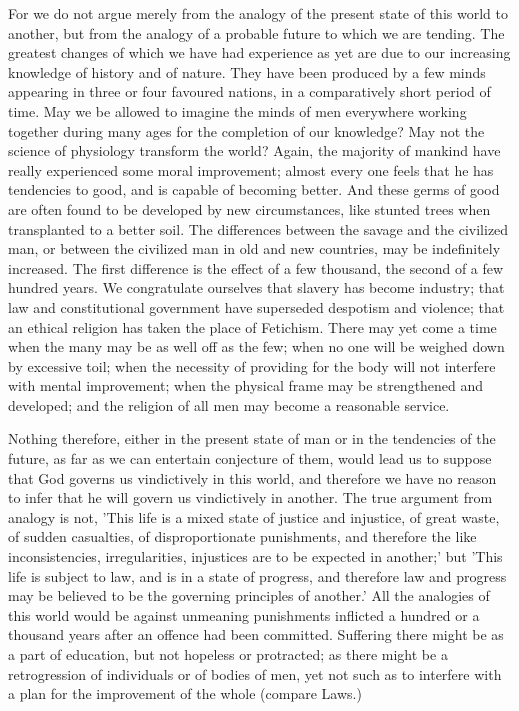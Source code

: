 For we do not argue merely from the analogy of the present state of this
world to another, but from the analogy of a probable future to which we
are tending. The greatest changes of which we have had experience as yet
are due to our increasing knowledge of history and of nature. They
have been produced by a few minds appearing in three or four favoured
nations, in a comparatively short period of time. May we be allowed to
imagine the minds of men everywhere working together during many ages
for the completion of our knowledge? May not the science of physiology
transform the world? Again, the majority of mankind have really
experienced some moral improvement; almost every one feels that he has
tendencies to good, and is capable of becoming better. And these germs
of good are often found to be developed by new circumstances, like
stunted trees when transplanted to a better soil. The differences
between the savage and the civilized man, or between the civilized
man in old and new countries, may be indefinitely increased. The first
difference is the effect of a few thousand, the second of a few hundred
years. We congratulate ourselves that slavery has become industry;
that law and constitutional government have superseded despotism and
violence; that an ethical religion has taken the place of Fetichism.
There may yet come a time when the many may be as well off as the few;
when no one will be weighed down by excessive toil; when the necessity
of providing for the body will not interfere with mental improvement;
when the physical frame may be strengthened and developed; and the
religion of all men may become a reasonable service.

Nothing therefore, either in the present state of man or in the
tendencies of the future, as far as we can entertain conjecture of them,
would lead us to suppose that God governs us vindictively in this
world, and therefore we have no reason to infer that he will govern us
vindictively in another. The true argument from analogy is not, 'This
life is a mixed state of justice and injustice, of great waste, of
sudden casualties, of disproportionate punishments, and therefore the
like inconsistencies, irregularities, injustices are to be expected
in another;' but 'This life is subject to law, and is in a state of
progress, and therefore law and progress may be believed to be the
governing principles of another.' All the analogies of this world would
be against unmeaning punishments inflicted a hundred or a thousand years
after an offence had been committed. Suffering there might be as a
part of education, but not hopeless or protracted; as there might be
a retrogression of individuals or of bodies of men, yet not such as to
interfere with a plan for the improvement of the whole (compare Laws.)

